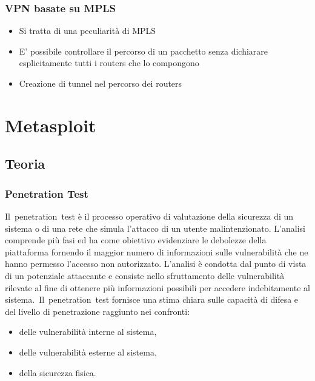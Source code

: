 \documentclass{article}
\begin{document}
\subsubsection{VPN basate su MPLS}
\begin{itemize}
    \item Si tratta di una peculiarità  di MPLS
    \item E’ possibile controllare il percorso di un pacchetto senza dichiarare esplicitamente tutti i 
    routers che lo compongono
    \item Creazione di tunnel nel percorso dei routers
\end{itemize}
\section{Metasploit}
\subsection{Teoria}
\subsubsection{Penetration Test}
Il penetration test è il processo operativo di valutazione della sicurezza di un sistema o di una rete che 
simula l'attacco di un utente malintenzionato. L'analisi comprende più fasi ed ha come obiettivo evidenziare 
le debolezze della piattaforma fornendo il maggior numero di informazioni sulle vulnerabilità che ne hanno 
permesso l'accesso non autorizzato. L'analisi è condotta dal punto di vista di un potenziale attaccante e 
consiste nello sfruttamento delle vulnerabilità rilevate al fine di ottenere più informazioni possibili 
per accedere indebitamente al sistema. Il penetration test fornisce una stima chiara sulle capacità di 
difesa e del livello di penetrazione raggiunto nei confronti: 
\begin{itemize}
    \item delle vulnerabilità interne al sistema,
    \item delle vulnerabilità esterne al sistema,
    \item della sicurezza fisica.
\end{itemize}
\end{document}

